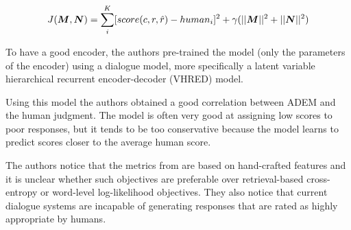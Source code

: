 \begin{equation}
J(\bm{M}, \bm{N}) = \sum_{i}^{K}[score(c,r,\hat{r}) - human_{i}]^{2} + \gamma (||\bm{M}||^2 + ||\bm{N}||^2)
\end{equation}

\par To have a good encoder, the authors pre-trained the model (only the parameters of the encoder) using a dialogue model, more specifically a latent variable hierarchical recurrent encoder-decoder (VHRED) model.

\par Using this model the authors obtained a good correlation between ADEM and the human judgment. The model is often very good at assigning low scores to poor responses, but it tends to be too conservative because the model learns to predict scores closer to the average human score. 

\par The authors notice that the metrics from \cite{Li:2016} are based on hand-crafted features and it is unclear whether such objectives are preferable over retrieval-based cross-entropy or word-level log-likelihood objectives. They also notice that current dialogue  systems are incapable of generating responses that are rated as highly appropriate by humans.
